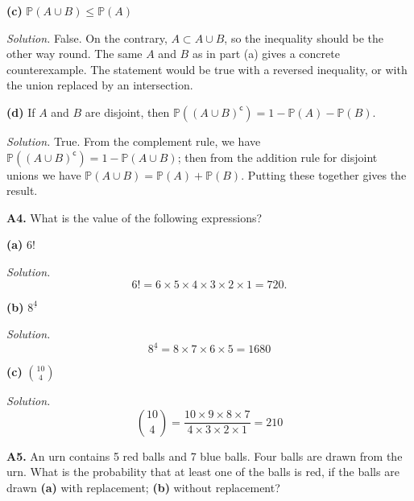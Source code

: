 \documentclass[
  a4paper,
]{book}
\theoremstyle{definition}
\theoremstyle{definition}
\theoremstyle{definition}
\theoremstyle{definition}
\theoremstyle{remark}
\begin{document}
\textbf{(c)} \(\mathbb P(A \cup B) \leq \mathbb P(A)\)

\begin{myanswers}
\emph{Solution.} False. On the contrary, \(A \subset A \cup B\), so the inequality should be the other way round. The same \(A\) and \(B\) as in part (a) gives a concrete counterexample. The statement would be true with a reversed inequality, or with the union replaced by an intersection.

\end{myanswers}

\textbf{(d)} If \(A\) and \(B\) are disjoint, then \(\mathbb P((A \cup B)^{\mathsf{c}}) = 1 - \mathbb P(A) - \mathbb P(B)\).

\begin{myanswers}
\emph{Solution.} True. From the complement rule, we have \(\mathbb P((A \cup B)^{\mathsf{c}}) = 1 - \mathbb P(A \cup B)\); then from the addition rule for disjoint unions we have \(\mathbb P(A \cup B) = \mathbb P(A) + \mathbb P(B)\). Putting these together gives the result.

\end{myanswers}

\textbf{A4.} What is the value of the following expressions?

\textbf{(a)} \(6!\)

\begin{myanswers}
\emph{Solution.}
\[ 6! = 6 \times 5 \times 4 \times 3 \times 2 \times 1 = 720. \]

\end{myanswers}

\textbf{(b)} \({8}^{\underline{4}}\)

\begin{myanswers}
\emph{Solution.}
\[ {8}^{\underline{4}} = 8 \times 7 \times 6 \times 5 = 1680 \]

\end{myanswers}

\textbf{(c)} \({\displaystyle \binom{10}{4}}\)

\begin{myanswers}
\emph{Solution.}
\[ \binom{10}{4} = \frac{10 \times 9 \times 8 \times 7}{4\times 3\times 2\times 1} = 210 \]

\end{myanswers}

\textbf{A5.} An urn contains 5 red balls and 7 blue balls. Four balls are drawn from the urn. What is the probability that at least one of the balls is red, if the balls are drawn \textbf{(a)} with replacement; \textbf{(b)} without replacement?
\end{document}

